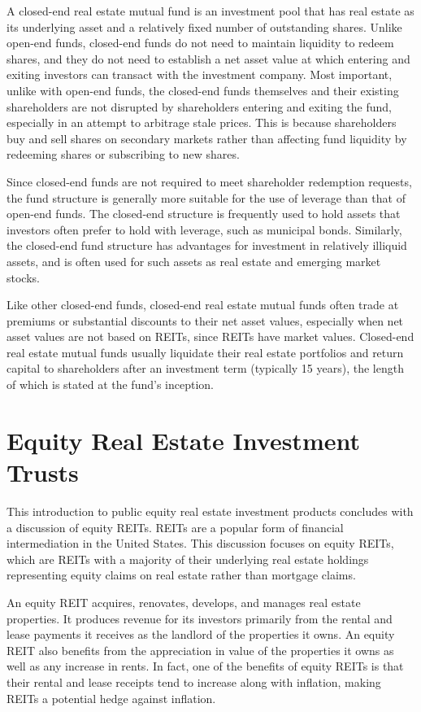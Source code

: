\documentclass[11pt]{article}
\begin{document}
A closed-end real estate mutual fund is an investment pool that has real estate as its underlying asset and a relatively fixed number of outstanding shares. Unlike open-end funds, closed-end funds do not need to maintain liquidity to redeem shares, and they do not need to establish a net asset value at which entering and exiting investors can transact with the investment company. Most important, unlike with open-end funds, the closed-end funds themselves and their existing shareholders are not disrupted by shareholders entering and exiting the fund, especially in an attempt to arbitrage stale prices. This is because shareholders buy and sell shares on secondary markets rather than affecting fund liquidity by redeeming shares or subscribing to new shares.

Since closed-end funds are not required to meet shareholder redemption requests, the fund structure is generally more suitable for the use of leverage than that of open-end funds. The closed-end structure is frequently used to hold assets that investors often prefer to hold with leverage, such as municipal bonds. Similarly, the closed-end fund structure has advantages for investment in relatively illiquid assets, and is often used for such assets as real estate and emerging market stocks.

Like other closed-end funds, closed-end real estate mutual funds often trade at premiums or substantial discounts to their net asset values, especially when net asset values are not based on REITs, since REITs have market values. Closed-end real estate mutual funds usually liquidate their real estate portfolios and return capital to shareholders after an investment term (typically 15 years), the length of which is stated at the fund's inception.

\section*{Equity Real Estate Investment Trusts}
This introduction to public equity real estate investment products concludes with a discussion of equity REITs. REITs are a popular form of financial intermediation in the United States. This discussion focuses on equity REITs, which are REITs with a majority of their underlying real estate holdings representing equity claims on real estate rather than mortgage claims.

An equity REIT acquires, renovates, develops, and manages real estate properties. It produces revenue for its investors primarily from the rental and lease payments it receives as the landlord of the properties it owns. An equity REIT also benefits from the appreciation in value of the properties it owns as well as any increase in rents. In fact, one of the benefits of equity REITs is that their rental and lease receipts tend to increase along with inflation, making REITs a potential hedge against inflation.
\end{document}
